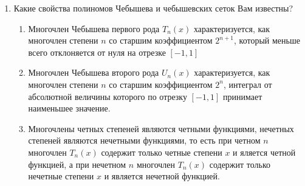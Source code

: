 \documentclass[12pt, a4paper]{article}
\begin{document}
\begin{enumerate}
{\bf Интерполирование многочленом лагранжа.} \\ $+\colon$ график интерполяционного многочлена Лагранжа проходит через каждую точку массива, конструируемая функция легко описывается (число подлежащих определению коэффициентов интерполяционного многочлена Лагранжа на сетке равно $n+1$), построенная функция имеет непрерывные производные любого порядка, заданным массивом интерполяционный многочлен определен однозначно. \\ $-\colon$ погрешности вычислений, неустойчивость для большого количества узлов, степень многочлена зависит от узлов сетки, необходимость все пересчитывать при добавлении нового узла.
\\
{\bf Интерполирование сплайнами.} \\ $+\colon$ график построенной функции проходит через каждую точку массива, конструируемая функция сравнительно легко описывается, степени многочленов не зависят от числа узлов сетки и, следовательно, не изменяются при его увеличении, построенная функция имеет непрерывные производные. \\ $-\colon$ осцилляция в окрестности точки, сильно отличающейся от соседних

\item Какие свойства полиномов Чебышева и чебышевских сеток Вам известны?
\begin{enumerate}
    \item Многочлен Чебышева первого рода $T_n(x)$ характеризуется, как многочлен степени $n$ со старшим коэффициентом $2^{n + 1}$, который меньше всего отклоняется от нуля на отрезке $[-1, 1]$
    \item Многочлен Чебышева второго рода $U_n(x)$ характеризуется, как многочлен степени $n$ со старшим коэффициентом $2^{n}$, интеграл от абсолютной величины которого по отрезку $[-1, 1]$ принимает наименьшее значение. 
    \item Многочлены четных степеней являются четными функциями, нечетных степеней являются нечетными функциями, то есть при четном $n$ многочлен $T_n(x)$ содержит только четные степени $x$ и яляется четной функцией, а при нечетном $n$ многочлен $T_n(x)$ содержит только нечетные степени $x$ и является нечетной функцией.
\end{enumerate}


\end{enumerate}
\newpage
\end{document}

